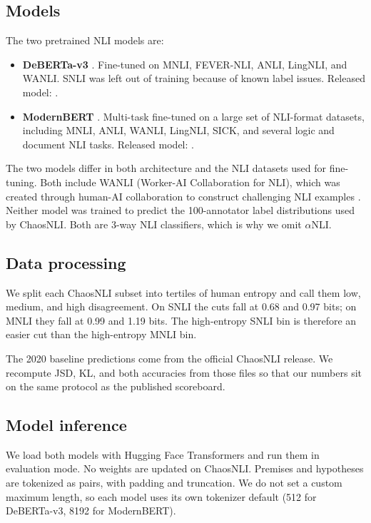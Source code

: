 \documentclass[11pt,a4paper]{article}
\begin{document}
\subsection{Models}

The two pretrained NLI models are:

\begin{itemize}[itemsep=0.4em, topsep=0.4em]
\item \textbf{DeBERTa-v3} \citep{he2023debertav3,laurer2024less}. Fine-tuned on MNLI, FEVER-NLI, ANLI, LingNLI, and WANLI. SNLI was left out of training because of known label issues. Released model: .
\item \textbf{ModernBERT} \citep{warner2024modernbert,sileo2024tasksource}. Multi-task fine-tuned on a large set of NLI-format datasets, including MNLI, ANLI, WANLI, LingNLI, SICK, and several logic and document NLI tasks. Released model: .
\end{itemize}

The two models differ in both architecture and the NLI datasets used for fine-tuning. Both include WANLI (Worker-AI Collaboration for NLI), which was created through human-AI collaboration to construct challenging NLI examples \citep{liu2022wanli}. Neither model was trained to predict the 100-annotator label distributions used by ChaosNLI. Both are 3-way NLI classifiers, which is why we omit $\alpha$NLI.

\subsection{Data processing}

We split each ChaosNLI subset into tertiles of human entropy and call them low, medium, and high disagreement. On SNLI the cuts fall at 0.68 and 0.97 bits; on MNLI they fall at 0.99 and 1.19 bits. The high-entropy SNLI bin is therefore an easier cut than the high-entropy MNLI bin.

The 2020 baseline predictions come from the official ChaosNLI release. We recompute JSD, KL, and both accuracies from those files so that our numbers sit on the same protocol as the published scoreboard.

\subsection{Model inference}

We load both models with Hugging Face Transformers and run them in evaluation mode. No weights are updated on ChaosNLI. Premises and hypotheses are tokenized as pairs, with padding and truncation. We do not set a custom maximum length, so each model uses its own tokenizer default (512 for DeBERTa-v3, 8192 for ModernBERT).
\end{document}
